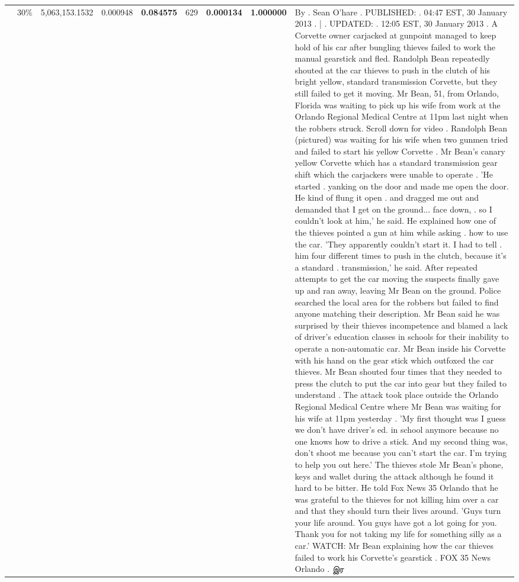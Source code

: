 \begin{table}[H]
\begin{tabular}{llrrrrrrl}
 & 30\% & 5,063,153.1532 & 0.000948 & \bfseries \color{red} 0.084575 & \color{red} 629 & \bfseries \color{red} 0.000134 & \bfseries \color{red} 1.000000 & By . Sean O'hare . PUBLISHED: . 04:47 EST, 30 January 2013 . | . UPDATED: . 12:05 EST, 30 January 2013 . A Corvette owner carjacked at gunpoint managed to keep hold of his car after bungling thieves failed to work the manual gearstick and fled. Randolph Bean repeatedly shouted at the car thieves to push in the clutch of his bright yellow, standard transmission Corvette, but they still failed to get it moving. Mr Bean, 51, from Orlando, Florida was waiting to pick up his wife from work at the Orlando Regional Medical Centre at 11pm last night when the robbers struck. Scroll down for video . Randolph Bean (pictured) was waiting for his wife when two gunmen tried and failed to start his yellow Corvette . Mr Bean's canary yellow Corvette which has a standard transmission gear shift which the carjackers were unable to operate . 'He started . yanking on the door and made me open the door. He kind of flung it open . and dragged me out and demanded that I get on the ground... face down, . so I couldn't look at him,' he said. He explained how one of the thieves pointed a gun at him while asking . how to use the car. 'They apparently couldn't start it. I had to tell . him four different times to push in the clutch, because it's a standard . transmission,' he said. After repeated attempts to get the car moving the suspects finally gave up and ran away, leaving Mr Bean on the ground. Police searched the local area for the robbers but failed to find anyone matching their description. Mr Bean said he was surprised by their thieves incompetence and blamed a lack of driver's education classes in schools for their inability to operate a non-automatic car. Mr Bean inside his Corvette with his hand on the gear stick which outfoxed the car thieves. Mr Bean shouted four times that they needed to press the clutch to put the car into gear but they failed to understand . The attack took place outside the Orlando Regional Medical Centre where Mr Bean was waiting for his wife at 11pm yesterday . 'My first thought was I guess we don't have driver's ed. in school anymore because no one knows how to drive a stick. And my second thing was, don't shoot me because you can't start the car. I'm trying to help you out here.' The thieves stole Mr Bean's phone, keys and wallet during the attack although he found it hard to be bitter. He told Fox News 35 Orlando that he was grateful to the thieves for not killing him over a car and that they should turn their lives around. 'Guys turn your life around. You guys have got a lot going for you. Thank you for not taking my life for something silly as a car.' WATCH: Mr Bean explaining how the car thieves failed to work his Corvette's gearstick . FOX 35 News Orlando . இர \\

\end{tabular}
\end{table}
